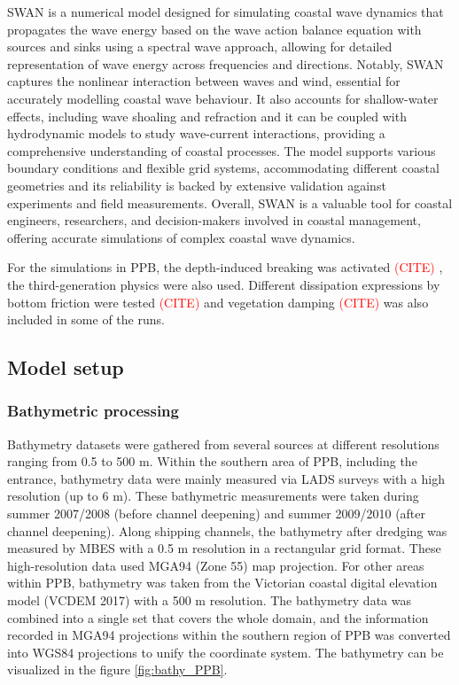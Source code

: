 \documentclass[12pt]{article}
\newcommand{\tocite}{\textcolor{red}{(CITE) }}
\begin{document}
SWAN is a numerical model designed for simulating coastal wave dynamics that propagates the wave energy based on the wave action balance equation with sources and sinks using a spectral wave approach, allowing for detailed representation of wave energy across frequencies and directions. Notably, SWAN captures the nonlinear interaction between waves and wind, essential for accurately modelling coastal wave behaviour. It also accounts for shallow-water effects, including wave shoaling and refraction and it can be coupled with hydrodynamic models to study wave-current interactions, providing a comprehensive understanding of coastal processes. The model supports various boundary conditions and flexible grid systems, accommodating different coastal geometries and its reliability is backed by extensive validation against experiments and field measurements. Overall, SWAN is a valuable tool for coastal engineers, researchers, and decision-makers involved in coastal management, offering accurate simulations of complex coastal wave dynamics.

For the simulations in PPB, the depth-induced breaking was activated \tocite, the third-generation physics were also used. Different dissipation expressions by bottom friction were tested \tocite and vegetation damping \tocite was also included in some of the runs.

\subsection{Model setup} \label{sec:model_setup}

\subsubsection{Bathymetric processing}

Bathymetry datasets were gathered from several sources at different resolutions ranging from 0.5 to 500 m. Within the southern area of PPB, including the entrance, bathymetry data were mainly measured via LADS surveys with a high resolution (up to 6 m). These bathymetric measurements were taken during summer 2007/2008 (before channel deepening) and summer 2009/2010 (after channel deepening). Along shipping channels, the bathymetry after dredging was measured by MBES with a 0.5 m resolution in a rectangular grid format. These high-resolution data used MGA94 (Zone 55) map projection. For other areas within PPB, bathymetry was taken from the Victorian coastal digital elevation model (VCDEM 2017) with a 500 m resolution. The bathymetry data was combined into a single set that covers the whole domain, and the information recorded in MGA94 projections within the southern region of PPB was converted into WGS84 projections to unify the coordinate system. The bathymetry can be visualized in the figure \ref{fig:bathy_PPB}.
\end{document}
